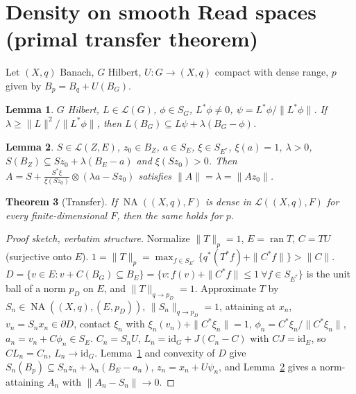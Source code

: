\documentclass[10pt]{amsart}
\newtheorem{theorem}{Theorem}[section]
\newtheorem{lemma}[theorem]{Lemma}
\theoremstyle{remark}
\newcommand{\ran}{\operatorname{ran}}
\newcommand{\id}[1]{\mathrm{id}_{#1}}
\newcommand{\NA}{\operatorname{NA}}
\newcommand{\Lin}{\mathcal{L}}
\begin{document}
\section{Density on smooth Read spaces (primal transfer theorem)}\label{sec:smooth}
Let $(X,q)$ Banach, $G$ Hilbert, $U:G\to(X,q)$ compact with dense range, $p$ given by $B_p=B_q+U(B_G)$.
\begin{lemma}\label{lem:nearball}
$G$ Hilbert, $L\in\Lin(G)$, $\phi\in S_G$, $L^*\phi\ne0$, $\psi=L^*\phi/\|L^*\phi\|$. If $\lambda\ge\|L\|^2/\|L^*\phi\|$, then $L(B_G)\subseteq L\psi+\lambda(B_G-\phi)$.
\end{lemma}
\begin{lemma}\label{lem:recenter}
$S\in\Lin(Z,E)$, $z_0\in B_Z$, $a\in S_E$, $\xi\in S_{E^*}$, $\xi(a)=1$, $\lambda>0$, $S(B_Z)\subseteq Sz_0+\lambda(B_E-a)$ and $\xi(Sz_0)>0$. Then $A=S+\frac{S^*\xi}{\xi(Sz_0)}\otimes(\lambda a-Sz_0)$ satisfies $\|A\|=\lambda=\|Az_0\|$.
\end{lemma}
\begin{theorem}[Transfer]\label{thm:transfer}
If $\NA((X,q),F)$ is dense in $\Lin((X,q),F)$ for every finite-dimensional $F$, then the same holds for $p$.
\end{theorem}
\begin{proof}[Proof sketch, verbatim structure]
Normalize $\|T\|_p=1$, $E=\ran T$, $C=TU$ (surjective onto $E$). $1=\|T\|_p=\max_{f\in S_{E^*}}\{q^*(T^*f)+\|C^*f\|\}>\|C\|$.
$D=\{v\in E: v+C(B_G)\subseteq B_E\}=\{v: f(v)+\|C^*f\|\le1\ \forall f\in S_{E^*}\}$ is the unit ball of a norm $p_D$ on $E$, and $\|T\|_{q\to p_D}=1$.
Approximate $T$ by $S_n\in\NA((X,q),(E,p_D))$, $\|S_n\|_{q\to p_D}=1$, attaining at $x_n$, $v_n=S_nx_n\in\partial D$, contact $\xi_n$ with $\xi_n(v_n)+\|C^*\xi_n\|=1$, $\phi_n=C^*\xi_n/\|C^*\xi_n\|$, $a_n=v_n+C\phi_n\in S_E$.
$C_n=S_nU$, $L_n=\id{G}+J(C_n-C)$ with $CJ=\id{E}$, so $CL_n=C_n$, $L_n\to\id{G}$. Lemma~\ref{lem:nearball} and convexity of $D$ give $S_n(B_p)\subseteq S_nz_n+\lambda_n(B_E-a_n)$, $z_n=x_n+U\psi_n$, and Lemma~\ref{lem:recenter} gives a norm-attaining $A_n$ with $\|A_n-S_n\|\to0$.
\end{proof}
\end{document}
